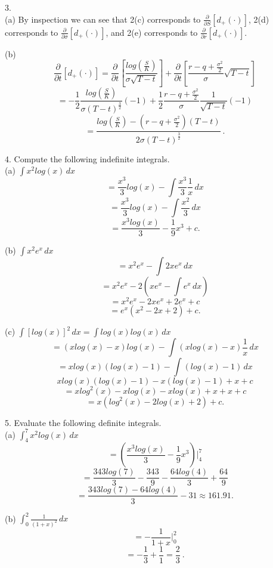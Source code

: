 \documentclass[11pt]{article}
\begin{document}
3.\\

(a) By inspection we can see that 2(c) corresponds to $\frac{\partial}{\partial S}[d_+(\cdot)]$, 2(d) corresponds to $\frac{\partial}{\partial \sigma}[d_+(\cdot)]$, and 2(e) corresponds to $\frac{\partial}{\partial r}[d_+(\cdot)]$.

(b)
$$\frac{\partial}{\partial t}[d_+(\cdot)] = \frac{\partial}{\partial t}\left[\frac{log(\frac{S}{K})}{\sigma\sqrt{T-t}}\right] + \frac{\partial}{\partial t}\left[\frac{r-q+\frac{\sigma^2}{2}}{\sigma}\sqrt{T-t}\right]$$
$$=-\frac{1}{2}\frac{log(\frac{S}{K})}{\sigma(T-t)^\frac{3}{2}}(-1) + \frac{1}{2}\frac{r-q+\frac{\sigma^2}{2}}{\sigma}\frac{1}{\sqrt{T-t}}(-1)$$
$$=\frac{log(\frac{S}{K})-(r-q+\frac{\sigma^2}{2})(T-t)}{2\sigma(T-t)^\frac{3}{2}}\:.$$

4. Compute the following indefinite integrals.\\

(a)	$\int x^2log(x)\,dx$
$$=\frac{x^3}{3}log(x) - \int \frac{x^3}{3}\frac{1}{x}\,dx$$
$$=\frac{x^3}{3}log(x) - \int \frac{x^2}{3}\,dx$$
$$=\frac{x^3log(x)}{3} - \frac{1}{9}x^3 + c.$$

(b)	$\int x^2e^x\,dx$
$$=x^2e^x - \int 2xe^x\,dx$$
$$=x^2e^x - 2(xe^x - \int e^x\,dx)$$
$$=x^2e^x-2xe^x+2e^x+c$$
$$=e^x(x^2-2x+2)+c.$$

(c)	$\int [log(x)]^2\,dx = \int log(x)log(x)\,dx$
$$=(xlog(x)-x)log(x)-\int(xlog(x)-x)\frac{1}{x}\,dx$$
$$=xlog(x)(log(x)-1)-\int(log(x)-1)\,dx$$
$$xlog(x)(log(x)-1)-x(log(x)-1)+x+c$$
$$=xlog^2(x)-xlog(x)-xlog(x)+x+x+c$$
$$=x(log^2(x)-2log(x)+2)+c.$$

5. Evaluate the following definite integrals.\\

(a)	$\int_{4}^{7} x^2log(x)\,dx$
$$= \left(\frac{x^3log(x)}{3} - \frac{1}{9}x^3\right)\Big|_4^7$$
$$= \frac{343log(7)}{3} - \frac{343}{9} -\frac{64log(4)}{3} + \frac{64}{9}$$
$$=\frac{343log(7) - 64log(4)}{3} - 31 \approx 161.91.$$

(b) $\int_{0}^{2} \frac{1}{(1+x)^2}\,dx$
$$=-\frac{1}{1+x}\Big|_0^2$$
$$=-\frac{1}{3} + \frac{1}{1} = \frac{2}{3}\:.$$
\end{document}
